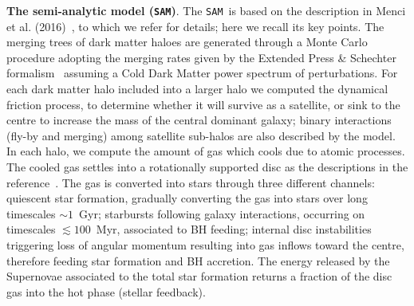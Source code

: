 \documentclass{natureprintstyle}
\newcommand{\sam}{\texttt{SAM}}
\begin{document}
\textbf{The semi-analytic model (\sam)}. The \sam\ is based on the description in Menci et al. (2016)~\cite{Menci2016}, to which we refer for details; here we recall its key points. 
The merging trees of dark matter haloes are generated through a Monte Carlo procedure adopting the merging rates given by the Extended Press \& Schechter formalism~\cite{Lacey1993} assuming a Cold Dark Matter power spectrum of perturbations. For each dark matter halo included into a larger halo we computed the dynamical friction process, to  determine whether it will survive as a satellite, or sink to the centre to increase the mass of the central dominant galaxy; binary interactions (fly-by and merging) among satellite sub-halos are also described by the model. In each halo, we compute the amount of gas which cools due to atomic processes. The cooled gas  settles into a rotationally supported disc as the descriptions in the reference~\cite{Mo1998}. The gas is converted into stars through three different channels: quiescent star formation, gradually converting the gas into stars over long timescales $\sim 1$~Gyr; starbursts following galaxy interactions, occurring on timescales $\lesssim 100$~Myr, associated to BH feeding; internal disc instabilities triggering loss of angular momentum resulting into gas inflows toward the centre, therefore feeding star formation and BH accretion. The energy released by the Supernovae associated to the total star formation returns a fraction of the disc gas into the hot phase (stellar feedback). 
\end{document}
